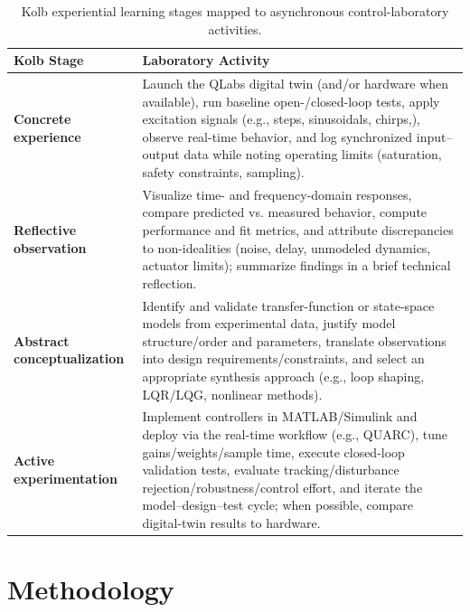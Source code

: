 \documentclass[journal]{IEEEtran}
\begin{document}
\begin{table}[!b]
\centering
\caption{\small Kolb experiential learning stages mapped to asynchronous control-laboratory activities.}
\label{tab:integrated-framework}
\renewcommand{\arraystretch}{1.15}
\footnotesize
\begin{tabularx}{\textwidth}{
  >{\raggedright\arraybackslash}p{}
  >{\raggedright\arraybackslash}X
}
\toprule
\textbf{Kolb Stage} & \textbf{Laboratory Activity} \\
\midrule
\textbf{Concrete experience} &
Launch the QLabs digital twin (and/or hardware when available), run baseline open-/closed-loop tests, apply excitation signals (e.g., steps, sinusoidals, chirps,), observe real-time behavior, and log synchronized input--output data while noting operating limits (saturation, safety constraints, sampling). \\
\midrule
\textbf{Reflective observation} &
Visualize time- and frequency-domain responses, compare predicted vs. measured behavior, compute performance and fit metrics, and attribute discrepancies to non-idealities (noise, delay, unmodeled dynamics, actuator limits); summarize findings in a brief technical reflection. \\
\midrule
\textbf{Abstract conceptualization} &
Identify and validate transfer-function or state-space models from experimental data, justify model structure/order and parameters, translate observations into design requirements/constraints, and select an appropriate synthesis approach (e.g., loop shaping, LQR/LQG, nonlinear methods). \\
\midrule
\textbf{Active experimentation} &
Implement controllers in MATLAB/Simulink and deploy via the real-time workflow (e.g., QUARC), tune gains/weights/sample time, execute closed-loop validation tests, evaluate tracking/disturbance rejection/robustness/control effort, and iterate the model--design--test cycle; when possible, compare digital-twin results to hardware. \\
\bottomrule
\end{tabularx}
\end{table}

\section{Methodology}
\label{sec:Methodology}

\end{document}
